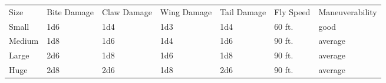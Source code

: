 \begin{table}[tbh]
\begin{small}
\begin{tabular}{lp{2cm}p{2.5cm}p{2.5cm}p{2cm}p{2cm}l}
Size&Bite Damage&Claw Damage&Wing Damage & Tail Damage&Fly Speed& Maneuverability\\
Small&1d6&1d4&1d3&1d4&60 ft.&good\\
Medium&1d8&1d6&1d4&1d6&90 ft.&average\\
Large&2d6&1d8&1d6&1d8&90 ft.&average\\
Huge&2d8&2d6&1d8&2d6&90 ft.&average\\
\end{tabular}
\end{small}
\end{table}
